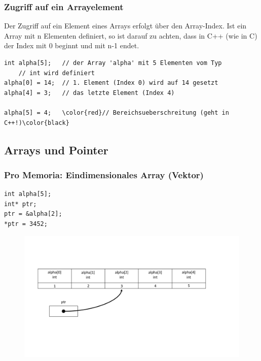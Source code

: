 \subsubsection{Zugriff auf ein Arrayelement}
\label{sec:Zugriff auf ein Arrayelement}
\begin{hinweis}
Der Zugriff auf ein Element eines Arrays erfolgt über den Array-Index. Ist ein Array mit n Elementen definiert, so ist darauf zu achten, dass in C++ (wie in C) der Index mit 0 beginnt und mit n-1 endet.
\end{hinweis}
\noindent
\begin{minipage}{\linewidth}
\begin{lstlisting}
int alpha[5];	// der Array 'alpha' mit 5 Elementen vom Typ
	// int wird definiert
alpha[0] = 14;	// 1. Element (Index 0) wird auf 14 gesetzt
alpha[4] = 3;	// das letzte Element (Index 4)

alpha[5] = 4;	\color{red}// Bereichsueberschreitung (geht in C++!)\color{black}
\end{lstlisting}
\end{minipage}


\subsection{Arrays und Pointer}
\label{sec:Arrays und Pointer}

\subsubsection{Pro Memoria: Eindimensionales Array (Vektor)}
\label{sec:Pro Memoria: Eindimensionales Array (Vektor)}
\noindent
\begin{minipage}{\linewidth}
\begin{lstlisting}
int alpha[5];
int* ptr;
ptr = &alpha[2];
*ptr = 3452;
\end{lstlisting}
\end{minipage}
\begin{figure}[h]
	\centering
	\includegraphics[width=\linewidth]{images/pointer9.pdf}
\end{figure}

